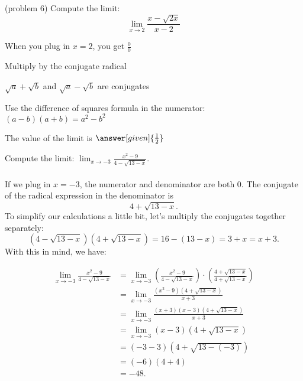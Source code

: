 \documentclass{ximera}
\begin{document}
\begin{problem}(problem 6)
  Compute the limit:
  \[
  \lim_{x \to 2} \frac{x- \sqrt{2x}}{x-2}
  \]
  
    \begin{hint}
      When you plug in $x = 2$, you get $\frac00$
    \end{hint}
    \begin{hint}
      Multiply by the conjugate radical
    \end{hint}
    \begin{hint}
      $\sqrt a + \sqrt b$ and $\sqrt a - \sqrt b$ are conjugates
    \end{hint}
    \begin{hint}
      Use the difference of squares formula in the numerator: $(a-b)(a+b) = a^2 - b^2$ 
    \end{hint}
    
		The value of the limit is
		 $\answer[given]{\frac12}$
		
\end{problem}



\begin{example}[example 7]
Compute the limit: $\displaystyle{\lim_{x \to -3} \frac{x^2 - 9}{4 - \sqrt{13 -x}}}$.\\
\\
If we plug in $x = -3$, the numerator and denominator are both 0. The conjugate of the radical expression in the denominator is
\[ 4 + \sqrt{13 -x}.\]
To simplify our calculations a little bit, let's multiply the conjugates together separately:
\[(4 - \sqrt{13 -x})(4 + \sqrt{13 -x}) = 16 - (13-x) = 3+x = x+3.\]
With this in mind, we have:

\begin{align*}
\lim_{x \to -3} \frac{x^2 - 9}{4 - \sqrt{13 -x}} &= 
\lim_{x \to -3} \left(\frac{x^2 - 9}{4 - \sqrt{13 -x}}\right) \cdot \left(\frac{4 + \sqrt{13 -x}}{4 + \sqrt{13 -x}}\right) \\
&=\lim_{x \to -3} \frac{(x^2 - 9)(4 + \sqrt{13 -x})}{x+3}\\
&=\lim_{x \to -3} \frac{(x+3)(x-3)(4 + \sqrt{13 -x})}{x+3} \\
&= \lim_{x \to -3} (x-3)(4 + \sqrt{13 -x})\\
&= (-3-3)(4 + \sqrt{13- (-3)}) \\
&= (-6)(4 + 4) \\
&= -48.
\end{align*}
\end{example}
\end{document}
